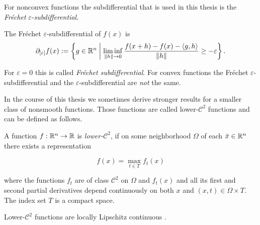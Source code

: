For nonconvex functions the subdifferential that is used in this thesis is the \emph{Fr\'{e}chet} \(\varepsilon\)-\emph{subdifferential}.

\begin{definition}
	The Fr\'{e}chet \(\varepsilon\)-subdifferential of \(f(x)\) is
	\[ \partial_{[\varepsilon]}f(x) := \left\{ g \in \mathbb{R}^n \biggm| \liminf_{\|h\| \to 0} \frac{f(x+h)-f(x)-\langle g,h\rangle}{\|h\|}  \geq -\varepsilon\right\}. \]
\end{definition}

For \(\varepsilon = 0\) this is called \emph{Fr\'echet subdifferential}.
For convex functions the Fr\'echet \(\varepsilon\)-subdifferential and the \(\varepsilon\)-subdifferential are \emph{not} the same.

In the course of this thesis we sometimes derive stronger results for a smaller class of nonsmooth functions. Those functions are called lower-\(\mathcal{C}^2\) functions and can be defined as follows.

\begin{definition}
\label{def_low_C2}
	A function \(f:\mathbb{R}^n \to \mathbb{R}\) is \emph{lower-}\(\mathcal{C}^2\), if on some neighborhood \(\Omega\) of each \(\bar{x} \in \mathbb{R}^n\) there exists a representation 
	
	\[ f(x) = \max_{t\in T}f_t(x) \]
	
	where the functions \(f_t\) are of class \(\mathcal{C}^2\) on \(\Omega\) and \(f_t(x)\) and all its first and second partial derivatives depend continuously on both \(x\) and \((x,t) \in \Omega \times T\).
	The index set \(T\) is a compact space.
\end{definition}

Lower-\(\mathcal{C}^2\) functions are locally Lipschitz continuous \cite[Theorem 10.31, p. 448]{Rockafellar2009}.


